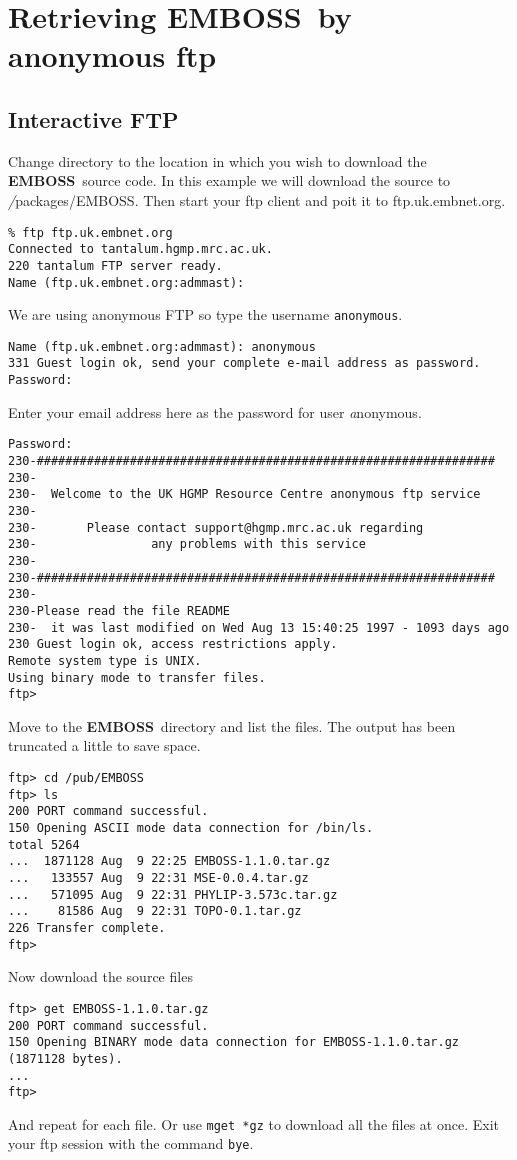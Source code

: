 \documentclass{report}
\newcommand{\ilcomm}[1]{{\tt #1}}
\newcommand{\filename}[1]{{\sf\textsl #1}}
\newcommand{\EMBOSS}{{\sf\bfseries EMBOSS}}
\begin{document}
\section{Retrieving \EMBOSS\ by anonymous ftp}
\subsection{Interactive FTP}

Change directory to the location in which you wish to download the \EMBOSS\ source code. In this example we will download the source to \filename{/packages/EMBOSS}. Then start your ftp client and poit it to ftp.uk.embnet.org.
\begin{verbatim}
% ftp ftp.uk.embnet.org
Connected to tantalum.hgmp.mrc.ac.uk.
220 tantalum FTP server ready.
Name (ftp.uk.embnet.org:admmast):
\end{verbatim}
We are using anonymous FTP so type the username \ilcomm{anonymous}.
\begin{verbatim}
Name (ftp.uk.embnet.org:admmast): anonymous
331 Guest login ok, send your complete e-mail address as password.
Password:
\end{verbatim}
Enter your email address here as the password for user \filename{anonymous}.
\begin{verbatim}
Password:
230-################################################################
230-
230-  Welcome to the UK HGMP Resource Centre anonymous ftp service
230-
230-       Please contact support@hgmp.mrc.ac.uk regarding
230-                any problems with this service
230-
230-################################################################
230-
230-Please read the file README
230-  it was last modified on Wed Aug 13 15:40:25 1997 - 1093 days ago
230 Guest login ok, access restrictions apply.
Remote system type is UNIX.
Using binary mode to transfer files.
ftp>
\end{verbatim}
Move to the \EMBOSS\ directory and list the files. The output has been truncated a little to save space.
\begin{verbatim}
ftp> cd /pub/EMBOSS
ftp> ls
200 PORT command successful.
150 Opening ASCII mode data connection for /bin/ls.
total 5264
...  1871128 Aug  9 22:25 EMBOSS-1.1.0.tar.gz
...   133557 Aug  9 22:31 MSE-0.0.4.tar.gz
...   571095 Aug  9 22:31 PHYLIP-3.573c.tar.gz
...    81586 Aug  9 22:31 TOPO-0.1.tar.gz
226 Transfer complete.
ftp>
\end{verbatim}
Now download the source files
\begin{verbatim}
ftp> get EMBOSS-1.1.0.tar.gz
200 PORT command successful.
150 Opening BINARY mode data connection for EMBOSS-1.1.0.tar.gz 
(1871128 bytes).
...
ftp>
\end{verbatim}
And repeat for each file. Or use \ilcomm{mget *gz} to download all the files at once.
Exit your ftp session with the command \ilcomm{bye}.
\end{document}
